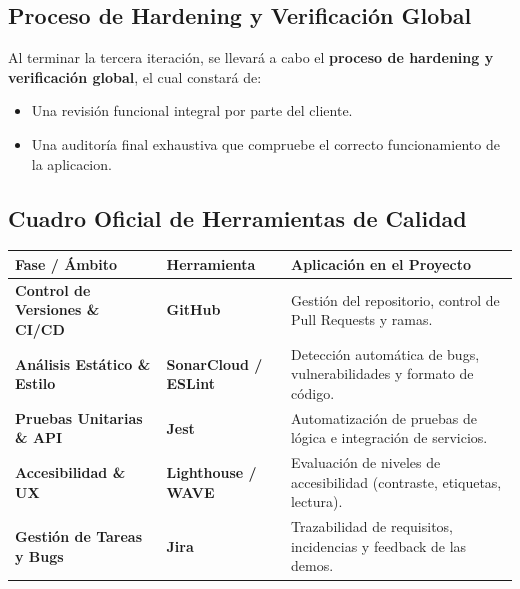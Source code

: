 \subsection{Proceso de Hardening y Verificación Global}
Al terminar la tercera iteración, se llevará a cabo el \textbf{proceso de hardening y verificación global}, el cual constará de:
\begin{itemize}[leftmargin=*]
  \item Una revisión funcional integral por parte del cliente.
  \item Una auditoría final exhaustiva que compruebe el correcto funcionamiento de la aplicacion.
\end{itemize}

\subsection{Cuadro Oficial de Herramientas de Calidad}

\vspace{0.2cm}
\noindent
{\small
\begin{tabularx}{\textwidth}{|>{\raggedright\arraybackslash\bfseries}p{3.8cm}|>{\raggedright\arraybackslash\bfseries}p{3.2cm}|X|}
\hline
\rowcolor{tableHeader}
Fase / Ámbito & Herramienta & Aplicación en el Proyecto \\
\hline
Control de Versiones \& CI/CD & GitHub & Gestión del repositorio, control de Pull Requests y ramas. \\
\hline
Análisis Estático \& Estilo & SonarCloud / ESLint & Detección automática de bugs, vulnerabilidades y formato de código. \\
\hline
Pruebas Unitarias \& API & Jest & Automatización de pruebas de lógica e integración de servicios. \\
\hline
Accesibilidad \& UX & Lighthouse / WAVE & Evaluación de niveles de accesibilidad (contraste, etiquetas, lectura). \\
\hline
Gestión de Tareas y Bugs & Jira & Trazabilidad de requisitos, incidencias y feedback de las demos. \\
\hline
\end{tabularx}
}
\vspace{0.3cm}
